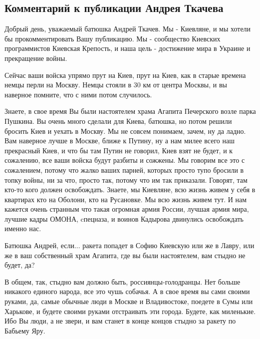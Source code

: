  
 
 
 
 

\subsection{Комментарий к публикации Андрея Ткачева}
\label{sec:moje.texts.05_02_2022.tkachev_andrej}

Добрый день, уважаемый батюшка Андрей Ткачев. Мы - Киевляне, и мы хотели бы
прокомментировать Вашу публикацию.  Мы - сообщество Киевских программистов
Киевская Крепость, и наша цель - достижение мира в Украине и прекращение войны.

Сейчас ваши войска упрямо прут на Киев, прут на Киев, как в старые времена
немцы перли на Москву. Немцы стояли в 30 км от центра Москвы, и вы наверное
помните, что с ними потом случилось. 

Знаете, в свое время Вы были настоятелем храма Агапита Печерского возле парка
Пушкина. Вы очень много сделали для Киева, батюшка, но потом решили бросить
Киев и уехать в Москву.  Мы не совсем понимаем, зачем, ну да ладно. Вам
наверное лучше в Москве, ближе к Путину, ну а нам милее всего наш прекрасный
Киев, и что бы там Путин не говорил, Киев взят не будет, и к сожалению, все
ваши войска будут разбиты и сожжены. Мы говорим все это с сожалением, потому
что жалко ваших парней, которых просто тупо бросили в топку войны, ни за что,
просто так, потому что им так приказали. Говорят, там кто-то кого должен
освобождать. Знаете, мы Киевляне, всю жизнь живем у себя в квартирах кто на
Оболони, кто на Русановке. Мы всю жизнь живем тут. И нам кажется очень странным
что такая огромная армия России, лучшая армия мира, лучшие кадры ОМОНА,
cпецназа, и воинов Кадырова двинулись освобождать именно нас.

Батюшка Андрей, если... ракета попадет в Софию Киевскую или же в Лавру, или же
в ваш собственный храм Агапита, где вы были настоятелем, вам стыдно не будет,
да?

В общем, так, стыдно вам должно быть, россиянцы-голодранцы. Нет больше никакого
единого народа, все это чушь собачья. А в свое время вы сами своими руками, да,
самые обычные люди в Москве и Владивостоке, поедете в Сумы или Харькове, и
будете своими руками отстраивать эти города. Будете, как миленькие.  Ибо Вы
люди, а не звери,  и вам станет в конце концов стыдно за ракету по Бабьему Яру.

